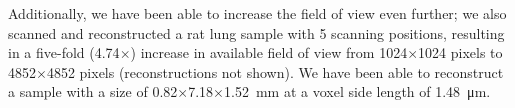 \begin{figure}
%
	\else
	\fi	
	\label{fig:ssim-details}
\end{figure}

Additionally, we have been able to increase the field of view even further; we also scanned and reconstructed a rat lung sample with 5 scanning positions, resulting in a five-fold (4.74$\times$) increase in available field of view from 1024$\times$1024 pixels to 4852$\times$4852 pixels (reconstructions not shown). We have been able to reconstruct a sample with a size of 0.82$\times$7.18$\times$\SI{1.52}{\milli\meter} %
at a voxel side length of \SI{1.48}{\micro\meter}.